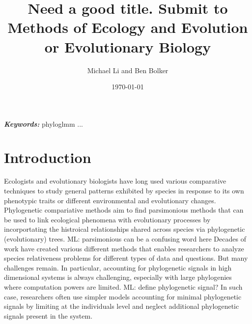 \documentclass[12pt]{article}
\title{Need a good title. Submit to Methods of Ecology and Evolution or Evolutionary Biology}
\author{Michael Li and Ben Bolker}
\date{\today}
\providecommand{\keywords}[1]{\textbf{\textit{Keywords:}} #1}
\begin{document}
\newcommand{\dbic}{\ensuremath \Delta \textrm{BIC}}

\newcommand{\bmbhide}[1]{}
\newcommand{\bmb}[1]{{\color{blue} BB: #1}}

\newcommand{\fref}[1]{Figure~\ref{fig:#1}}

\newcommand{\ml}[1]{{\color{red} ML: #1}}

\newcommand{\add}[1]{{\color{blue} ADD: #1}}

\maketitle

\doublespacing

\keywords{phyloglmm ... }

\section{Introduction}

Ecologists and evolutionary biologists have long used various comparative techniques to study general patterns exhibited by species in response to its own phenotypic traits or different environmental and evolutionary changes.
Phylogenetic compariative methods aim to find parsimonious methods that can be used to link ecological phenomena with evolutionary processes by incorportating the histroical relationships shared across species via phylogenetic (evolutionary) trees. 
\ml{parsimonious can be a confusing word here}
Decades of work have created various different methods that enables researchers to analyze species relativeness problems for different types of data and questions.
But many challenges remain.
In particular, accounting for phylogenetic signals in high dimensional systems is always challenging, especially with large phylogenies where computation powers are limited.
\ml{define phylogenetic signal?}
In such case, researchers often use simpler models accounting for minimal phylogenetic signals by limiting at the individuals level and neglect additional phylogenetic signals present in the system.
\end{document}
